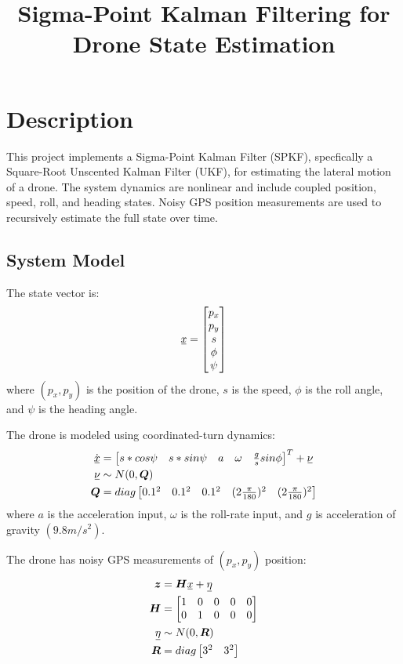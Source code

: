 \documentclass[11pt, letterpaper, twocolumn]{article}
\title{Sigma-Point Kalman Filtering for Drone State Estimation}
\author{}
\date{}
\newcommand{\ul}[1] %
    {{}\mkern1mu\underline{\mkern-1mu#1\mkern-1mu}\mkern1mu}
\begin{document}
\maketitle

\section*{Description}

This project implements a Sigma-Point Kalman Filter (SPKF), specfically a Square-Root 
Unscented Kalman Filter (UKF), for estimating the lateral motion of a drone. The system
dynamics are nonlinear and include coupled position, speed, roll, and heading states.
Noisy GPS position measurements are used to recursively estimate the full state
over time.

\subsection*{System Model}

The state vector is:
\[ \ul{x} = \begin{bmatrix}
    p_x \\
    p_y \\
    s \\
    \phi \\
    \psi
\end{bmatrix}
\]
where $(p_x,p_y)$ is the position of the drone, $s$ is the speed, $\phi$ is the roll
angle, and $\psi$ is the heading angle. 

The drone is modeled using coordinated-turn dynamics:
\[\begin{aligned}
\dot{\ul{x}} &= \begin{bmatrix}
            s*cos\psi & s*sin\psi & a & \omega & \frac{g}{s}sin\phi
        \end{bmatrix} ^T + \ul{\nu} \\
\ul{\nu} &\sim N(0,\bm{Q}) \\
\bm{Q} &= diag\begin{bmatrix}
            0.1^2 & 0.1^2 & 0.1^2 & (2\frac{\pi}{180})^2 & (2\frac{\pi}{180})^2
        \end{bmatrix}
\end{aligned}\]
where $a$ is the acceleration input, $\omega$ is the roll-rate input, and $g$
is acceleration of gravity $(9.8 m/s^2)$.

The drone has noisy GPS measurements of $(p_x, p_y)$ position:
\[\begin{aligned}
    \bm{z} &= \bm{H}\ul{x} + \ul{\eta} \\
\bm{H} &= \begin{bmatrix}
            1 & 0 & 0 & 0 & 0 \\
            0 & 1 & 0 & 0 & 0
        \end{bmatrix} \\
\ul{\eta} &\sim N(0,\bm{R}) \\
\bm{R} &= diag\begin{bmatrix}
            3^2 & 3^2
        \end{bmatrix}
\end{aligned}\]
\end{document}
